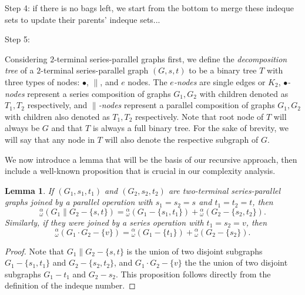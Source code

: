 \documentclass{article}
\newtheorem{lem}[thm]{Lemma}
\newcommand{\idq}{{}^{\alpha}_{\omega}}
\begin{document}
Step 4: if there is no bags left, we start from the bottom to merge these indeque sets to update their parents' indeque sets...

Step 5: 


\medskip










 






Considering $2$-terminal series-parallel graphs first, we define the {\em decomposition tree} of a $2$-terminal series-parallel graph $(G, s, t)$ to be a binary tree $T$ with three types of nodes: $\bullet$, $\parallel$, and $e$ nodes. The {\em $e$-nodes} are single edges or $K_2$, {\em $\bullet$-nodes} represent a series composition of graphs $G_1, G_2$ with children denoted as $T_1,T_2$ respectively, and {\em $\parallel$-nodes} represent a parallel composition of graphs $G_1, G_2$ with children also denoted as $T_1,T_2$ respectively. Note that root node of $T$ will always be $G$ and that $T$ is always a full binary tree. For the sake of brevity, we will say that any node in $T$ will also denote the respective subgraph of $G$. 

We now introduce a lemma that will be the basis of our recursive approach, then include a well-known proposition that is crucial in our complexity analysis.

\begin{lem}\label{lem:sp-op}
    If $(G_1, s_1, t_1)$ and $(G_2, s_2, t_2)$ are two-terminal series-parallel graphs joined by a parallel operation with $s_1 = s_2 = s$ and $t_1 = t_2 = t$, then $$\idq(G_1 \| G_2 - \{s, t\}) = \idq(G_1 - \{s_1, t_1\}) +\idq(G_2 - \{s_2, t_2\}).$$ Similarly, if they were joined by a series operation with $t_1 = s_2 = v$, then $$\idq(G_1 \cdot G_2 - \{v\}) = \idq(G_1 - \{t_1\}) +\idq(G_2 - \{s_2\}).$$
\end{lem}
\begin{proof}
    Note that $G_1\| G_2-\{s,t\}$ is the union of two disjoint subgraphs $G_1-\{s_1,t_1\}$ and $G_2-\{s_2,t_2\}$, and $G_1\cdot G_2-\{v\}$ the the union of two disjoint subgraphs $G_1-t_1$ and $G_2-s_2$. This proposition follows directly from the definition of the indeque number. 
\end{proof}
\end{document}
